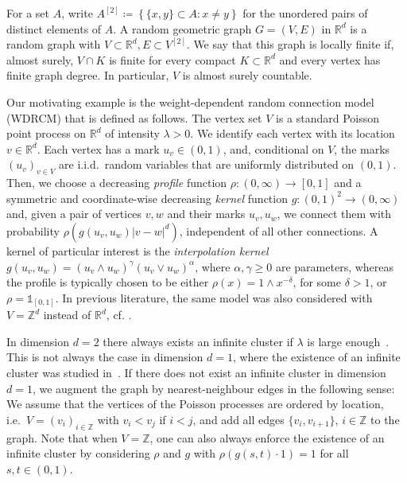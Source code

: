 \documentclass[11pt,a4paper]{scrartcl}
\newcommand{\Z}{\mathbb{Z}}
\newcommand{\R}{\mathbb{R}}
\newcommand{\1}{\mathbb{1}}
\begin{document}
For a set \(A\), write \(A^{[2]} \coloneqq \left\{ \{x,y\} \subset A : x \neq y  \right\}\) for the unordered pairs of distinct
elements of \(A\).  A random geometric graph \(G=(V,E)\) in \(\R^d\) is a random graph with $V\subset \R^d, E \subset V^{[2]}$. We say that this graph is locally finite if, almost surely, \(V\cap K\) is finite for every
compact \(K\subset\R^d\) and every vertex has finite graph degree.  In
particular, \(V\) is almost surely countable.  

Our motivating example is the weight-dependent random connection model (WDRCM) that is defined as follows. The vertex set \(V\) is a standard Poisson point process on \(\R^d\) of intensity \(\lambda>0\). We identify each vertex with its location \(v\in\R^d\). Each vertex has a mark \(u_v\in(0,1)\), and, conditional on $V$, the marks $(u_v)_{v \in V}$ are i.i.d.\ random variables that are uniformly distributed on $(0,1)$. Then, we choose a decreasing \emph{profile} function \(\rho\colon (0,\infty)\to[0,1]\) and a symmetric and coordinate-wise decreasing \emph{kernel} function \(g:(0,1)^2\to(0,\infty)\) and, given a pair of vertices \(v,w\) and their marks \(u_v,u_w\), we connect them with probability \(\rho(g(u_v,u_w)|v-w|^d)\), independent of all other connections. A kernel of particular interest is the \emph{interpolation kernel} \(g(u_v,u_w)=(u_v\wedge u_w)^\gamma (u_v\vee u_w)^\alpha\), where \(\alpha,\gamma\geq 0\) are parameters, whereas the profile is typically chosen to be either \(\rho(x)=1\wedge x^{-\delta}\), for some \(\delta>1\), or \(\rho=\1_{[0,1]}\). In previous literature, the same model was also considered with $V=\Z^d$ instead of $\R^d$, cf. \cite{berger2004,Berger2002,Baeumler2023_recurrence}.

In dimension \(d=2\) there always exists an infinite cluster if \(\lambda\) is large enough~\cite{GLM2021}. This is not always the case in dimension \(d=1\), where the existence of an infinite cluster was studied in~\cite{GracarLuechtrathMoench2025}. If there does not exist an infinite cluster in dimension $d=1$, we augment the graph by nearest-neighbour edges in the following sense: We assume that the vertices of the Poisson processes are ordered by location, i.e.\ \(V=(v_i)_{i\in\Z}\) with \(v_i<v_j\) if \(i<j\), and add all edges \(\{v_i,v_{i+1}\}\), \(i\in\Z\) to the graph. 
Note that when $V = \Z$, one can also always enforce the existence of an infinite cluster by considering $\rho$ and $g$ with $\rho(g(s,t)\cdot 1)=1$ for all $s,t \in (0,1)$.

\end{document}
